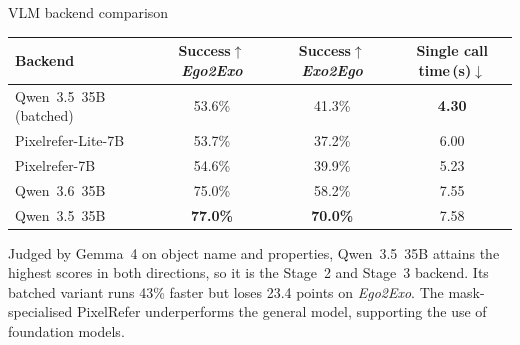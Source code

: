 \documentclass[professionalfonts,aspectratio=169]{beamer}
\begin{document}
\begin{frame}[t]
\begin{center}
{\large VLM backend comparison}
\end{center}
\vfill
\begin{center}
\small
\setlength{\tabcolsep}{6pt}
\begin{tabular}{lccc}
  \toprule
  Backend & \shortstack{Success$\uparrow$\\\textit{Ego2Exo}}
          & \shortstack{Success$\uparrow$\\\textit{Exo2Ego}}
          & \shortstack{Single call\\time\,(s)$\downarrow$} \\
  \midrule
  Qwen~3.5~35B (batched) & 53.6\% & 41.3\% & \textbf{4.30} \\
  Pixelrefer-Lite-7B     & 53.7\% & 37.2\% & 6.00 \\
  Pixelrefer-7B          & 54.6\% & 39.9\% & 5.23 \\
  Qwen~3.6~35B           & 75.0\% & 58.2\% & 7.55 \\
  Qwen~3.5~35B           & \textbf{77.0\%} & \textbf{70.0\%} & 7.58 \\
  \bottomrule
\end{tabular}
\end{center}
\vspace{0.8em}
\begin{center}
\begin{minipage}{0.88\textwidth}
\small
Judged by Gemma~4 on object name and properties, Qwen~3.5~35B attains the highest scores in both directions, so it is the Stage~2 and Stage~3 backend. Its batched variant runs 43\% faster but loses 23.4 points on \textit{Ego2Exo}. The mask-specialised PixelRefer underperforms the general model, supporting the use of foundation models.
\end{minipage}
\end{center}
\vfill
\end{frame}

\end{document}
